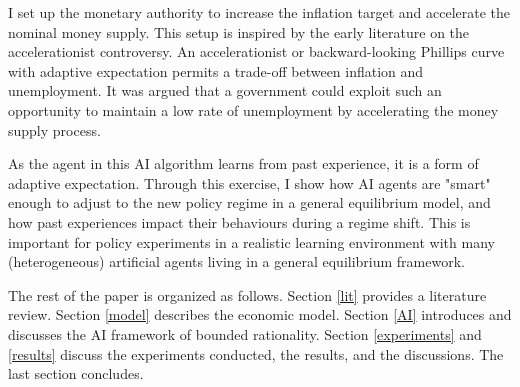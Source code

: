 \documentclass[hidelinks]{article}
\begin{document}
I set up the monetary authority to increase the inflation target and accelerate the nominal money supply. This setup is inspired by the early literature on the accelerationist controversy. An accelerationist or backward-looking Phillips curve with adaptive expectation permits a trade-off between inflation and unemployment. It was argued that a government could exploit such an opportunity to maintain a low rate of unemployment by accelerating the money supply process. 

As the agent in this AI algorithm learns from past experience, it is a form of adaptive expectation. Through this exercise, I show how AI agents are "smart" enough to adjust to the new policy regime in a general equilibrium model, and how past experiences impact their behaviours during a regime shift. This is important for policy experiments in a realistic learning environment with many (heterogeneous) artificial agents living in a general equilibrium framework. 



 
 The rest of the paper is organized as follows. Section \ref{lit} provides a literature review. Section \ref{model} describes the economic model.  Section \ref{AI} introduces and discusses the AI framework of bounded rationality. Section \ref{experiments} and \ref{results} discuss the experiments conducted, the results, and the discussions. The last section concludes.
 
\end{document}
